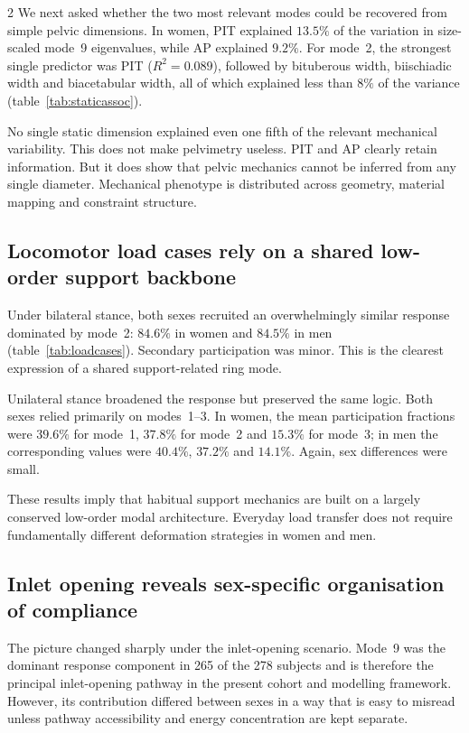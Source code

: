 \documentclass[openacc]{rsproca_new}
\begin{document}
\begin{multicols}{2}
We next asked whether the two most relevant modes could be recovered from simple pelvic dimensions. In women, PIT explained $13.5\%$ of the variation in size-scaled mode~9 eigenvalues, while AP explained $9.2\%$. For mode~2, the strongest single predictor was PIT ($R^2=0.089$), followed by bituberous width, biischiadic width and biacetabular width, all of which explained less than $8\%$ of the variance (table~\ref{tab:staticassoc}).

No single static dimension explained even one fifth of the relevant mechanical variability. This does not make pelvimetry useless. PIT and AP clearly retain information. But it does show that pelvic mechanics cannot be inferred from any single diameter. Mechanical phenotype is distributed across geometry, material mapping and constraint structure.

\subsection{Locomotor load cases rely on a shared low-order support backbone}

Under bilateral stance, both sexes recruited an overwhelmingly similar response dominated by mode~2: $84.6\%$ in women and $84.5\%$ in men (table~\ref{tab:loadcases}). Secondary participation was minor. This is the clearest expression of a shared support-related ring mode.

Unilateral stance broadened the response but preserved the same logic. Both sexes relied primarily on modes~1--3. In women, the mean participation fractions were $39.6\%$ for mode~1, $37.8\%$ for mode~2 and $15.3\%$ for mode~3; in men the corresponding values were $40.4\%$, $37.2\%$ and $14.1\%$. Again, sex differences were small.

These results imply that habitual support mechanics are built on a largely conserved low-order modal architecture. Everyday load transfer does not require fundamentally different deformation strategies in women and men.

\subsection{Inlet opening reveals sex-specific organisation of compliance}

The picture changed sharply under the inlet-opening scenario. Mode~9 was the dominant response component in 265 of the 278 subjects and is therefore the principal inlet-opening pathway in the present cohort and modelling framework. However, its contribution differed between sexes in a way that is easy to misread unless pathway accessibility and energy concentration are kept separate.


\end{multicols}
\end{document}
